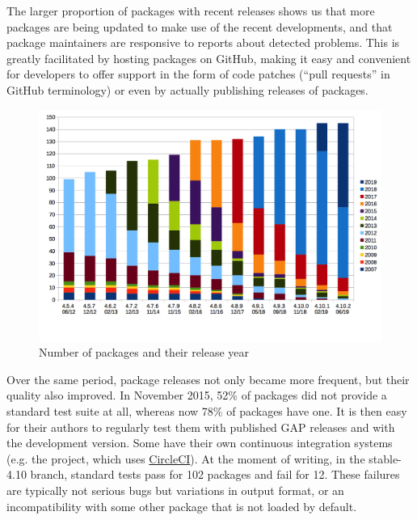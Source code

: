 The larger proportion of packages with recent releases shows us that 
more packages are being updated to make use of the recent \GAP developments,
and that package maintainers are responsive to reports about detected problems.
This is greatly facilitated by hosting packages on GitHub, making it
easy and convenient for \GAP developers to offer support in the form
of code patches (``pull requests'' in GitHub terminology) or even by
actually publishing releases of packages.

\begin{figure}[!ht]
    \centering
    \includegraphics[width=\textwidth]{images/gap-package-releases}
    \caption{Number of \GAP packages and their release year}
    \label{fig:gap-package-releases}
\end{figure}


Over the same period, package releases not only became more frequent,
but their quality also 
improved. In November 2015, 52\% of packages did not provide a standard 
test suite at all, whereas now 78\% of packages have one.
It is then easy for their authors to  regularly test them 
with published GAP releases and with the development version.
Some have their own continuous integration systems
(e.g. the \href{https://homalg-project.github.io/} project,
which uses \href{https://circleci.com/}{CircleCI}).
At the moment of writing, in the stable-4.10 branch,
standard tests pass for 102 packages
and fail for 12.
These failures are typically not serious bugs but variations in output
format, or an incompatibility with some other package
that is not loaded by default.

